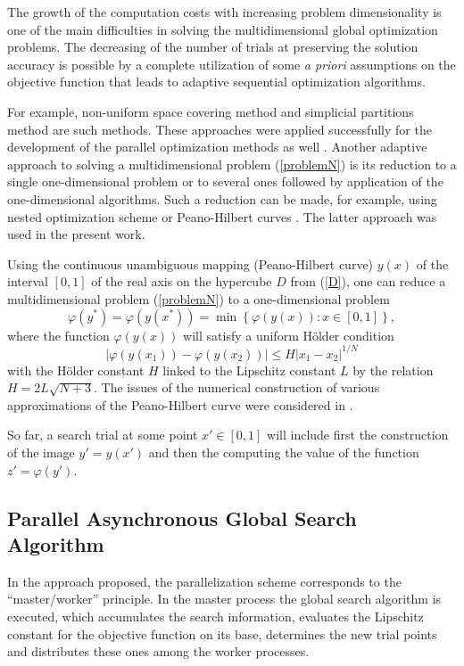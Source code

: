 \documentclass{svproc}
\begin{document}
The growth of the computation costs with increasing problem dimensionality is one of the main difficulties in solving the multidimensional global optimization problems. The decreasing of the number of trials at preserving the solution accuracy is possible by a complete utilization of some {\it a priori} assumptions on the objective function that leads to adaptive sequential optimization algorithms.

For example, non-uniform space covering method \cite{Evtushenko2013} and simplicial partitions method \cite{Zilinskas2010} are such methods. These approaches were applied successfully for the development of the parallel optimization methods as well \cite{Evtushenko2009,Paulavicius2011}. 
Another adaptive approach to solving a multidimensional problem (\ref{problemN}) is its reduction to a single one-dimensional problem or to several ones followed by application of the one-dimensional algorithms. 
Such a reduction can be made, for example, using nested optimization scheme \cite{Grishagin2018} or Peano-Hilbert curves \cite{Barkalov2018}. 
The latter approach was used in the present work.

Using the continuous unambiguous mapping (Peano-Hilbert curve) $y(x)$ of the interval $[0,1]$ of the real axis on the hypercube $D$ from (\ref{D}), one can reduce a multidimensional problem (\ref{problemN}) to a one-dimensional problem
\[
\varphi(y^\ast)=\varphi(y(x^\ast))=\min{\left\{\varphi(y(x)): x\in[0,1]\right\}},
\]
where the function $\varphi(y(x))$ will satisfy a uniform H{\"o}lder condition
\[
\left|\varphi(y(x_1))-\varphi(y(x_2))\right|\leq H\left|x_1-x_2\right|^{1/N}
\]
with the H{\"o}lder constant $H$ linked to the Lipschitz constant $L$ by the relation $ H=2 L \sqrt{N+3}$. 
The issues of the numerical construction of various approximations of the Peano-Hilbert curve were considered in \cite{Strongin2000,Sergeyev2013}.

So far, a search trial at some point $x'\in[0,1]$ will include first the construction of the image $y'=y(x')$ and then the computing the value of the function $z'=\varphi(y')$.

\subsection{Parallel Asynchronous Global Search Algorithm}

In the approach proposed, the parallelization scheme corresponds to the ``master/worker'' principle.
In the master process the global search algorithm is executed, which accumulates the search information, evaluates the Lipschitz constant for the objective function on its base, determines the new trial points and distributes these ones among the worker processes. 
\end{document}
